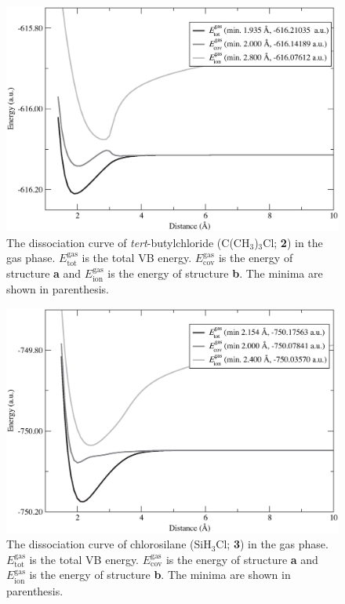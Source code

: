 \begin{figure}[h]
\begin{center}
\includegraphics[scale=0.55]{dissociation/figures/c4h9cl_g.eps}
\end{center}
\caption{The dissociation curve of \textit{tert}-butylchloride (C(CH$_3$)$_3$Cl; \textbf{2}) in the gas phase. $E_\mathrm{tot}^\mathrm{gas}$ is the total VB energy. $E_\mathrm{cov}^\mathrm{gas}$ is the energy of structure \textbf{a} and $E_\mathrm{ion}^\mathrm{gas}$ is the energy of structure \textbf{b}. The minima are shown in parenthesis.}
\label{ch3.fig.c4h9cl}
\end{figure}
\begin{figure}[h]
\begin{center}
\includegraphics[scale=0.55]{dissociation/figures/sih3cl_g.eps}
\end{center}
\caption{The dissociation curve of chlorosilane (SiH$_3$Cl; \textbf{3}) in the gas phase. $E_\mathrm{tot}^\mathrm{gas}$ is the total VB energy. $E_\mathrm{cov}^\mathrm{gas}$ is the energy of structure \textbf{a} and $E_\mathrm{ion}^\mathrm{gas}$ is the energy of structure \textbf{b}. The minima are shown in parenthesis.}
\label{ch3.fig.sih3cl}
\end{figure}

